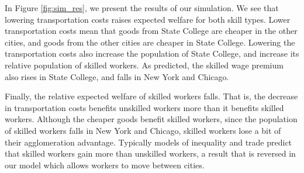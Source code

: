 \documentclass[12 pt]{article}
\begin{document}
In Figure \ref{fig:sim_res}, we present the results of our simulation.  We see that lowering transportation costs raises expected welfare for both skill types.  Lower transportation costs mean that goods from State College are cheaper in the other cities, and goods from the other cities are cheaper in State College.  Lowering the transportation costs also increase the population of State College, and increase its relative population of skilled workers.  As predicted, the skilled wage premium also rises in State College, and falls in New York and Chicago.

Finally, the relative expected welfare of skilled workers falls.  That is, the decrease in transportation costs benefits unskilled workers more than it benefits skilled workers.  Although the cheaper goods benefit skilled workers, since the population of skilled workers falls in New York and Chicago, skilled workers lose a bit of their agglomeration advantage.  Typically models of inequality and trade predict that skilled workers gain more than unskilled workers, a result that is reversed in our model which allows workers to move between cities.
\end{document}
